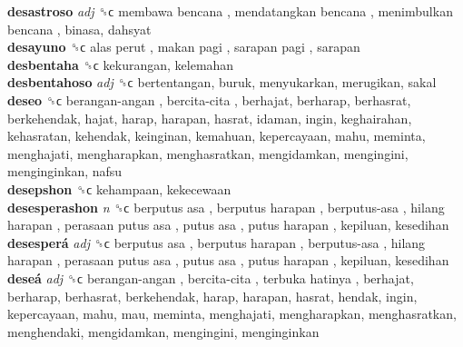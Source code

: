 \textbf{desastroso} \emph{adj}  ␝ϲ   membawa bencana ,  mendatangkan bencana ,  menimbulkan bencana , binasa, dahsyat  \\
\textbf{desayuno} ␝ϲ   alas perut ,  makan pagi ,  sarapan pagi , sarapan  \\
\textbf{desbentaha} ␝ϲ  kekurangan, kelemahan  \\
\textbf{desbentahoso} \emph{adj}  ␝ϲ  bertentangan, buruk, menyukarkan, merugikan, sakal  \\
\textbf{deseo} ␝ϲ   berangan-angan ,  bercita-cita , berhajat, berharap, berhasrat, berkehendak, hajat, harap, harapan, hasrat, idaman, ingin, keghairahan, kehasratan, kehendak, keinginan, kemahuan, kepercayaan, mahu, meminta, menghajati, mengharapkan, menghasratkan, mengidamkan, mengingini, menginginkan, nafsu  \\
\textbf{desepshon} ␝ϲ  kehampaan, kekecewaan  \\
\textbf{desesperashon} \emph{n}  ␝ϲ   berputus asa ,  berputus harapan ,  berputus-asa ,  hilang harapan ,  perasaan putus asa ,  putus asa ,  putus harapan , kepiluan, kesedihan  \\
\textbf{desesperá} \emph{adj}  ␝ϲ   berputus asa ,  berputus harapan ,  berputus-asa ,  hilang harapan ,  perasaan putus asa ,  putus asa ,  putus harapan , kepiluan, kesedihan  \\
\textbf{deseá} \emph{adj}  ␝ϲ   berangan-angan ,  bercita-cita ,  terbuka hatinya , berhajat, berharap, berhasrat, berkehendak, harap, harapan, hasrat, hendak, ingin, kepercayaan, mahu, mau, meminta, menghajati, mengharapkan, menghasratkan, menghendaki, mengidamkan, mengingini, menginginkan  \\
